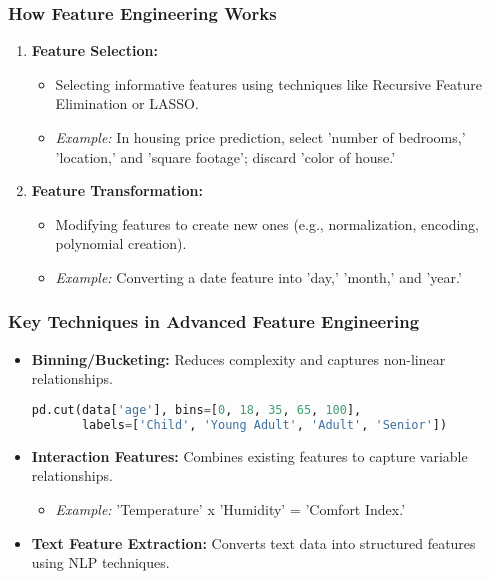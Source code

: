 \documentclass[aspectratio=169]{beamer}
\begin{document}
\begin{frame}[fragile]
    \frametitle{How Feature Engineering Works}
    \begin{enumerate}
        \item \textbf{Feature Selection:} 
        \begin{itemize}
            \item Selecting informative features using techniques like Recursive Feature Elimination or LASSO.
            \item \textit{Example:} In housing price prediction, select 'number of bedrooms,' 'location,' and 'square footage'; discard 'color of house.'
        \end{itemize}
        
        \item \textbf{Feature Transformation:} 
        \begin{itemize}
            \item Modifying features to create new ones (e.g., normalization, encoding, polynomial creation).
            \item \textit{Example:} Converting a date feature into 'day,' 'month,' and 'year.'
        \end{itemize}
    \end{enumerate}
\end{frame}

\begin{frame}[fragile]
    \frametitle{Key Techniques in Advanced Feature Engineering}
    \begin{itemize}
        \item \textbf{Binning/Bucketing:} Reduces complexity and captures non-linear relationships.
        \begin{lstlisting}[language=Python]
pd.cut(data['age'], bins=[0, 18, 35, 65, 100],
       labels=['Child', 'Young Adult', 'Adult', 'Senior'])
        \end{lstlisting}
        
        \item \textbf{Interaction Features:} Combines existing features to capture variable relationships.
        \begin{itemize}
            \item \textit{Example:} 'Temperature' x 'Humidity' = 'Comfort Index.'
        \end{itemize}
        
        \item \textbf{Text Feature Extraction:} Converts text data into structured features using NLP techniques.
    \end{itemize}
\end{frame}
\end{document}
